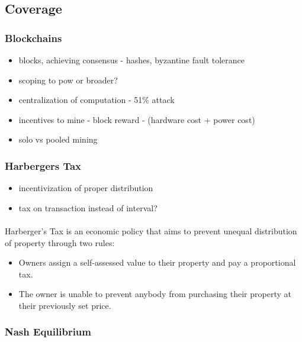 \subsection{Coverage}

\subsubsection{Blockchains}

\begin{itemize}
  \item blocks, achieving consensus - hashes, byzantine fault tolerance
  \item scoping to pow or broader?
  \item centralization of computation - 51\% attack
  \item incentives to mine - block reward - (hardware cost + power cost)
  \item solo vs pooled mining
\end{itemize}

\subsubsection{Harbergers Tax} \label{section:harbergerstax}

\begin{itemize}
  \item incentivization of proper distribution
  \item tax on transaction instead of interval?
\end{itemize}

\paragraph{} Harberger's Tax is an economic policy that aims to prevent unequal distribution of property through two rules:

\begin{itemize}
  \item Owners assign a self-assessed value to their property and pay a proportional tax.
  \item The owner is unable to prevent anybody from purchasing their property at their previously set price.
\end{itemize}

\subsubsection{Nash Equilibrium}

